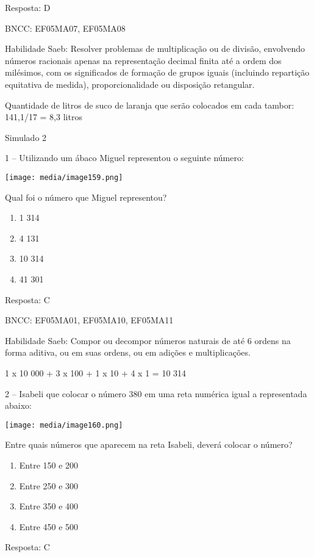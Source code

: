 Resposta: D

BNCC: EF05MA07, EF05MA08

Habilidade Saeb: Resolver problemas de multiplicação ou de divisão,
envolvendo números racionais apenas na representação decimal finita até
a ordem dos milésimos, com os significados de formação de grupos iguais
(incluindo repartição equitativa de medida), proporcionalidade ou
disposição retangular.

Quantidade de litros de suco de laranja que serão colocados em cada
tambor: 141,1/17 = 8,3 litros

Simulado 2

1 -- Utilizando um ábaco Miguel representou o seguinte número:

\texttt{[image: media/image159.png]}

Qual foi o número que Miguel representou?

\begin{enumerate}
\def\labelenumi{\alph{enumi})}
\item
  1 314
\item
  4 131
\item
  10 314
\item
  41 301
\end{enumerate}

Resposta: C

BNCC: EF05MA01, EF05MA10, EF05MA11

Habilidade Saeb: Compor ou decompor números naturais de até 6 ordens na
forma aditiva, ou em suas ordens, ou em adições e multiplicações.

1 x 10 000 + 3 x 100 + 1 x 10 + 4 x 1 = 10 314

2 -- Isabeli que colocar o número 380 em uma reta numérica igual a
representada abaixo:

\texttt{[image: media/image160.png]}

Entre quais números que aparecem na reta Isabeli, deverá colocar o
número?

\begin{enumerate}
\def\labelenumi{\alph{enumi})}
\item
  Entre 150 e 200
\item
  Entre 250 e 300
\item
  Entre 350 e 400
\item
  Entre 450 e 500
\end{enumerate}

Resposta: C

